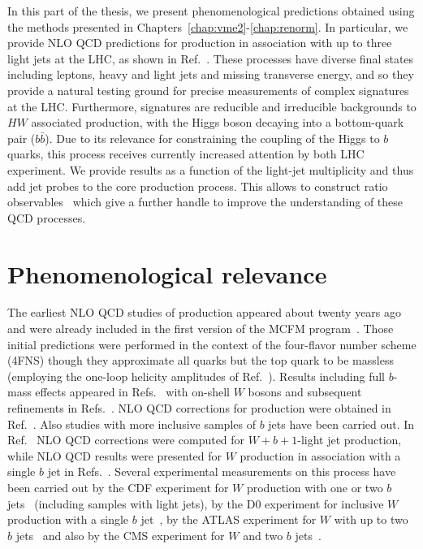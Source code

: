 
In this part of the thesis, we present phenomenological
predictions obtained using the methods presented in
Chapters~\ref{chap:vme2}-\ref{chap:renorm}. In particular, we provide NLO QCD predictions for \Wbb{} production in association with up to three light
jets at the LHC, as shown in
Ref.~\cite{wbbpaper}. These processes have diverse final states including leptons, heavy and light jets and missing
transverse energy, and so they provide a natural testing ground for precise measurements of complex signatures at the LHC.
Furthermore, \Wbb{} signatures are reducible and irreducible backgrounds to $HW$ associated
production, with the Higgs boson decaying into a bottom-quark pair ($b\bar b$). Due to its relevance for constraining the coupling of the Higgs to $b$ quarks, this process
receives currently increased attention by both LHC experiment.
%
We provide results as a function of the light-jet multiplicity and thus add jet probes to the core
production process. This allows to construct ratio observables~\cite{JetRatios1,JetRatios2,JetRatios3,JetRatios4,BH:Wratios} which give a further handle to improve the understanding of these QCD processes. 



\section{Phenomenological relevance}

The earliest NLO QCD studies of \Wbb{}
production appeared about twenty years ago~\cite{Ellis:1998fv} and were already included in the first version
of the MCFM program~\cite{mcfm7}. Those initial predictions were performed in the context of the four-flavor number
scheme (4FNS) though they approximate all quarks but the top quark to be massless (employing the one-loop helicity amplitudes of Ref.~\cite{Bern:1997sc}).
Results including full $b$-mass effects appeared in
Refs.~\cite{FebresCordero:2006sj,Cordero:2009kv} with on-shell $W$ bosons and
subsequent refinements in Refs.~\cite{Badger:2010mg,Oleari:2011ey}. NLO QCD
corrections for \Wbbnj[1]{} production were obtained
in Ref.~\cite{Luisoni:2015mpa}.  Also studies with
more inclusive samples of $b$ jets have been carried out. In
Ref.~\cite{Campbell:2006cu} NLO QCD corrections were computed for $W+b+1$-light
jet production, while NLO QCD results were presented for $W$ production in
association with a single $b$ jet in Refs.~\cite{Campbell:2008hh,Caola:2011pz}. Several experimental measurements on this process have been carried out by the CDF experiment for $W$
production with one or two $b$ jets~\cite{Aaltonen:2009qi} (including samples
with light jets), by the D0 experiment for inclusive $W$ production with a single $b$
jet~\cite{D0:2012qt}, by the ATLAS experiment for $W$ with up to two $b$
jets~\cite{Aad:2013vka} and also by the CMS experiment for $W$ and two $b$
jets~\cite{Chatrchyan:2013uza,CMS:2016bb}.

